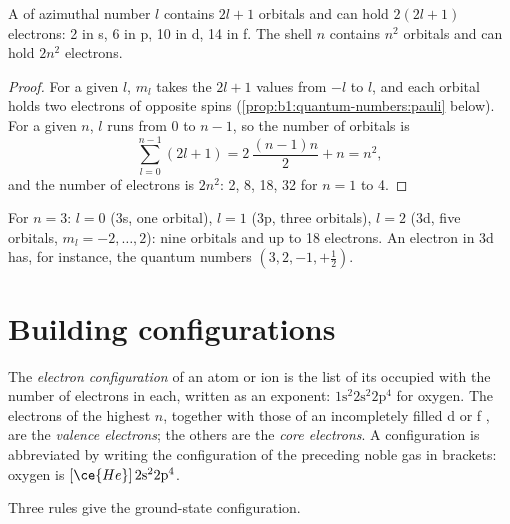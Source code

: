 \begin{proposition}\label{prop:b1:quantum-numbers:capacity}
A  of azimuthal number $l$ contains $2l + 1$ orbitals and can hold
$2(2l + 1)$ electrons: 2 in s, 6 in p, 10 in d, 14 in f. The shell $n$
contains $n^2$ orbitals and can hold $2n^2$ electrons.
\end{proposition}

\begin{proof}
For a given $l$, $m_l$ takes the $2l + 1$ values from $-l$ to $l$, and
each orbital holds two electrons of opposite spins (\cref{prop:b1:quantum-numbers:pauli}
below). For a given $n$, $l$ runs from $0$ to $n - 1$, so the number of
orbitals is
\[
  \sum_{l=0}^{n-1} (2l+1) = 2\,\frac{(n-1)n}{2} + n = n^2 ,
\]
and the number of electrons is $2n^2$: 2, 8, 18, 32 for $n = 1$ to 4.
\end{proof}

\begin{example}\label{ex:b1:quantum-numbers:third}
For $n = 3$: $l = 0$ (3s, one orbital), $l = 1$ (3p, three orbitals),
$l = 2$ (3d, five orbitals, $m_l = -2, \dots, 2$): nine orbitals and up
to 18 electrons. An electron in 3d has, for instance, the quantum
numbers $(3, 2, -1, +\tfrac12)$.
\end{example}

\section{Building configurations}

\begin{definition}\label{def:b1:quantum-numbers:configuration}
The \emph{electron configuration} of an
atom or ion is the list of its occupied  with the number of
electrons in each, written as an exponent: $1\text{s}^2 2\text{s}^2
2\text{p}^4$ for oxygen. The electrons of the highest $n$, together with
those of an incompletely filled d or f , are the \emph{valence
electrons}; the others are the \emph{core
electrons}. A configuration is abbreviated by
writing the configuration of the preceding noble gas in brackets:
oxygen is $[\ce{He}]\,2\text{s}^2 2\text{p}^4$.
\end{definition}

Three rules give the ground-state configuration.

